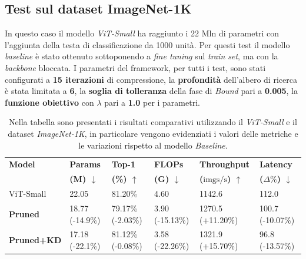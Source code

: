 \subsection{Test sul dataset ImageNet-1K}
In questo caso il modello \textit{ViT-Small} ha raggiunto i 22 Mln di parametri
con l'aggiunta della testa di classificazione da 1000 unità. Per questi test il
modello \textit{baseline} è stato ottenuto sottoponendo a \textit{fine tuning}
sul \textit{train set}, ma con la \textit{backbone} bloccata. I parametri del
framework, per tutti i test, sono stati configurati a \textbf{15 iterazioni} di
compressione, la \textbf{profondità} dell'albero di ricerca è stata limitata a
\textbf{6}, la \textbf{soglia di tolleranza} della fase di \textit{Bound} pari
a \textbf{0.005}, la \textbf{funzione obiettivo} con \textbf{$\lambda$} pari a
\textbf{1.0} per i parametri.
\begin{table}[H]
    \centering
    \footnotesize
    \setlength{\tabcolsep}{4pt}
    \begin{tabular}{@{} l l l l l l @{}}
        \toprule
        \textbf{Model} & \textbf{Params} & \textbf{Top-1} & \textbf{FLOPs} & \textbf{Throughput} & \textbf{Latency} \\ 
                       & \textbf{(M) $\downarrow$}    & \textbf{(\%) $\uparrow$}  & \textbf{(G) $\downarrow$}   & \textbf{($\text{imgs}/\text{s}$) $\uparrow$} & \textbf{($\Delta\%$) $\downarrow$} \\ 
        \midrule
        ViT-Small          & 22.05 \hphantom{(-00.0\%)}                 & 81.20\% \hphantom{(-0.00\%)}                 & 4.60 \hphantom{(-00.00\%)}          & 1142.6 \hphantom{(+00.00\%)}                    & 112.0 \hphantom{(-00.00\%)}               \\
        \midrule
        \textbf{Pruned}    & 18.77 (-14.9\%)                            & 79.17\% (-2.03\%)                            & 3.90 (-15.13\%)                     & 1270.5 (+11.20\%)                               & 100.7 (-10.07\%)                          \\
        \midrule
        \textbf{Pruned+KD} & 17.18 (-22.1\%)                            & 81.12\% (-0.08\%)                            & 3.58 (-22.26\%)                     & 1321.9 (+15.70\%)                               & 96.8 (-13.57\%)                           \\
        \bottomrule
    \end{tabular}
    \vspace{10pt}
    \caption{Nella tabella sono presentati i risultati comparativi utilizzando il \textit{ViT-Small} e il dataset \textit{ImageNet-1K}, in particolare vengono evidenziati i valori delle metriche e le variazioni rispetto al modello \textit{Baseline}.}
    \label{tab:risultati-ImageNet}
\end{table}
